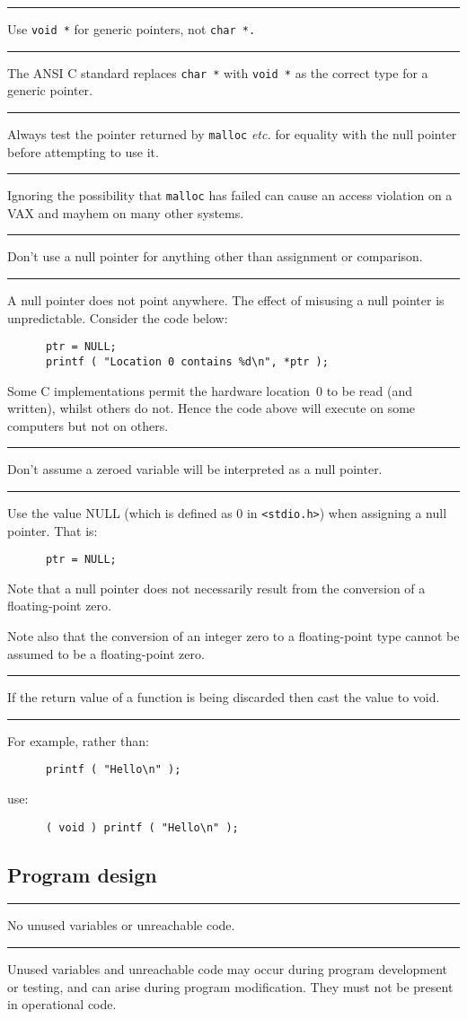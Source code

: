 \documentclass[twoside,11pt]{article}
\newcounter{sruleno}
\newcommand{\srule}[1]{
    \addtocounter{sruleno}{1}
    \goodbreak
    \rule[0.5ex]{\textwidth}{0.3mm}
    {\Large #1 \hfill {\thesruleno}}
    \rule[0.5ex]{\textwidth}{0.1mm}
}
\newcommand{\srule}[1]{
       \addtocounter{sruleno}{1}
       \begin{rawhtml} <HR> \end{rawhtml}
       {\Large \thesruleno}~~~~{\Large #1}
       \begin{rawhtml} <HR> \end{rawhtml}
       \end{tabular}
  }
\begin{document}
\srule{Use {\tt void *} for generic pointers, not {\tt char *.}}
The ANSI C standard replaces {\tt char~*} with {\tt void~*} as the
correct type for a generic pointer.


\srule{Always test the pointer returned by {\tt malloc} {\it etc.}
for equality with   the null pointer before attempting to use it.}
Ignoring the possibility that {\tt malloc} has failed
can cause an access violation
on a  VAX and mayhem on many other systems.

\srule{Don't use a null pointer for anything other than assignment or
comparison.}
A null pointer does not point anywhere. The effect of misusing a
null pointer is unpredictable.
Consider the code below:
\begin{verbatim}
      ptr = NULL;
      printf ( "Location 0 contains %d\n", *ptr );
\end{verbatim}
Some C implementations permit the
hardware location~0 to be read (and written), whilst others do not.
Hence the code above will execute on some computers but not on others.

\srule{Don't assume a zeroed variable will be interpreted as a null pointer.}
Use the value NULL (which is defined as 0 in \verb!<stdio.h>!)
when assigning a null pointer. That is:
\begin{verbatim}
      ptr = NULL;
\end{verbatim}
Note that a null pointer does not necessarily
result from the conversion of a floating-point zero.

Note also that the conversion of an integer zero to a floating-point type
cannot be assumed to be a floating-point zero.

\srule{If the return value of a function is being discarded then
cast the  value to void.}
For example, rather than:
\begin{verbatim}
      printf ( "Hello\n" );
\end{verbatim}
use:
\begin{verbatim}
      ( void ) printf ( "Hello\n" );
\end{verbatim}

\newpage
\subsection{Program design}

\srule{No unused variables or unreachable code.}
Unused variables and unreachable code may occur during program development or
testing, and can arise during program modification.  They must not be present
in operational code.
\end{document}
